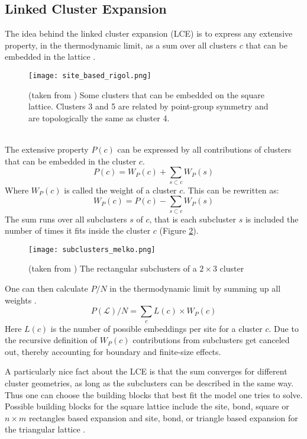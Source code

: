 \documentclass[a4paper,12pt]{article}
\begin{document}
\subsection{Linked Cluster Expansion}

The idea behind the linked cluster expansion (LCE) is to
express any extensive property, in the thermodynamic limit, as a sum
over all clusters $c$ that can be embedded in the lattice
\cite{Rigol}.\\
\begin{figure}[htbp]
\centerline{\texttt{[image: site\_based\_rigol.png]}}
\caption[]{\label{fig:3} (taken from \cite{Rigol}) Some clusters that can be embedded on the
  square lattice. Clusters 3 and 5 are related by point-group symmetry and are topologically the same as cluster 4.}
\end{figure}\\
The extensive property $P(c)$ can be expressed by all contributions of
clusters that can be embedded in the cluster $c$.\\
\begin{equation}
\label{eq:9}
P(c) = W_P(c) + \sum\limits_{s \subset c} W_P(s)
\end{equation}
Where $W_P(c)$ is called the weight of a cluster $c$.
This can be rewritten as:
\begin{equation}
\label{eq:4}
W_P(c) = P(c) - \sum\limits_{s \subset c} W_P(s)
\end{equation}
The sum runs over all subclusters $s$ of $c$, that is each subcluster $s$ is
included the number of times it fits inside the cluster $c$ (Figure \ref{fig:sub}).
\begin{figure}[htbp]
\centerline{\texttt{[image: subclusters\_melko.png]}}
\caption[]{\label{fig:sub} (taken from \cite{Melko}) The rectangular subclusters of a $2 \times 3$ cluster}
\end{figure}

One can then calculate $P/N$ in the thermodynamic limit by summing up
all weights \cite{Rigol}.
\begin{equation}
\label{eq:3}
P(\mathcal{L})/N = \sum\limits_c L(c) \times W_P(c)
\end{equation}
Here $L(c)$ is the number of possible embeddings per site for a cluster
$c$. Due to the recursive definition of $W_P(c)$ contributions from
subclusters get canceled out, thereby accounting for boundary and
finite-size effects.

A particularly nice fact about the LCE is that the sum converges for
different cluster geometries, as long as the subclusters can be
described in the same way. Thus one can choose the
building blocks that best fit the model one tries to solve. Possible building blocks for the square
lattice include the site, bond, square or
$n \times m$ rectangles based expansion and site, bond, or triangle
based expansion for the triangular lattice \cite{Rigol,Kallin}.
\end{document}
